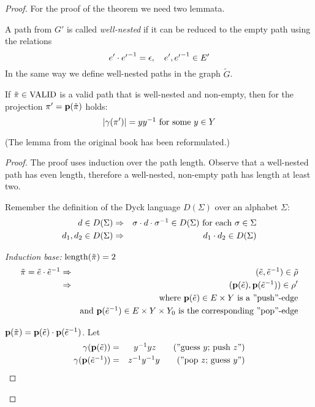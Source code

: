 \begin{proof}
For the proof of the theorem we need two lemmata.

A path from $G'$ is called {\em well-nested} if it can be reduced to the empty
path using the relations 
\[ e' \cdot \mbox{${e'}^{-1}$} = \epsilon,\quad e', \mbox{${e'}^{-1}$} \in E' \]
In the same way we define well-nested paths in the graph $\tilde{G}$.

\begin{lemma}
If $\tilde{\pi} \in \mathrm{VALID}$ is a valid path that is well-nested and
non-empty, then for the projection $\pi' = \mathbf{p}({\tilde{\pi}})$ holds:
\[ |\gamma(\pi')| = y \mbox{${y}^{-1}$}\text{ for some }y \in Y \]
\end{lemma}

(The lemma from the original book has been reformulated.)
\begin{proof}
The proof uses induction over the path length. Observe that a well-nested
path has even length, therefore a well-nested, non-empty path has length at
least two.

Remember the definition of the Dyck language $D(\Sigma)$ over an alphabet
$\Sigma$:
\begin{eqnarray*}
d \in D(\Sigma) &\Rightarrow& \sigma \cdot d \cdot \mbox{${\sigma}^{-1}$} \in
D(\Sigma)\text{ for each }\sigma \in \Sigma \\
d_1, d_2 \in D(\Sigma) &\Rightarrow& d_1 \cdot d_2 \in D(\Sigma)
\end{eqnarray*}

{\em Induction base:} $\mathrm{length}({\tilde{\pi}})=2$
\begin{eqnarray*}
\tilde{\pi} = \tilde e \cdot \mbox{${\tilde e}^{-1}$} &\Rightarrow& (\tilde e, \mbox{${\tilde
e}^{-1}$}) \in \tilde{\rho} \\
&\Rightarrow& (\mathbf{p}({\tilde e}), \mathbf{p}({\mbox{${\tilde e}^{-1}$}})) \in \rho' \\
&& \text{where }\mathbf{p}({\tilde e}) \in E \times Y\text{ is a ''push''-edge} \\
&& \text{and }\mathbf{p}({\mbox{${\tilde e}^{-1}$}}) \in E \times Y \times Y_0\text{ is the
corresponding ''pop''-edge}
\end{eqnarray*}

$\mathbf{p}({\tilde{\pi}}) = \mathbf{p}({\tilde e}) \cdot \mathbf{p}({\mbox{${\tilde e}^{-1}$}})$. Let
\begin{eqnarray*}
\gamma(\mathbf{p}({\tilde e})) &=& \mbox{${y}^{-1}$} y z \qquad\text{(''guess $y$;\ push $z$'')}
\\
\gamma(\mathbf{p}({\mbox{${\tilde e}^{-1}$}})) &=& \mbox{${z}^{-1}$} \mbox{${y}^{-1}$} y \qquad\text{(''pop $z$;\
guess $y$'')}
\end{eqnarray*}


\end{proof}
\end{proof}
